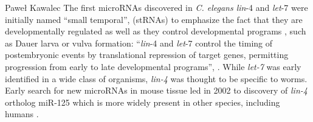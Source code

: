 \begin{artengenv}{Paweł Kawalec}
The first microRNAs discovered in \textit{C. elegans lin}-4 and \textit{let}-7 were initially named ``small temporal'', (stRNAs) to emphasize the fact that they are developmentally regulated as well as they control developmental programs
\parencite[][]{lagos-quintana_identification_2002}, %
 such as Dauer larva or vulva formation: ``\textit{lin}-4 and \textit{let}-7 control the timing of postembryonic events by translational repression of target genes, permitting progression from early to late developmental programs'', 
\parencite[][p.9]{sempere_temporal_2003}. %
 While \textit{let-7} was early identified in a wide class of organisms, \textit{lin-4} was thought to be specific to worms. Early search for new microRNAs in mouse tissue led in 2002 to discovery of \textit{lin-4} ortholog miR-125 which is more widely present in other species, including humans 
\parencite[][]{yin_progress_2015}. %



\end{artengenv}
